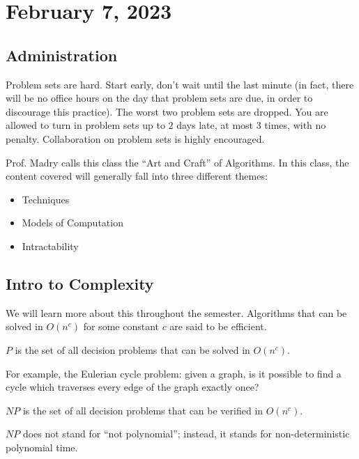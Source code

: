 \section{February 7, 2023}

\subsection{Administration}

Problem sets are hard. Start early, don't wait until the last minute (in fact, there will be no office hours on the day that problem sets are due, in order to discourage this practice). The worst two problem sets are dropped. You are allowed to turn in problem sets up to $2$ days late, at most $3$ times, with no penalty. Collaboration on problem sets is highly encouraged.

Prof. Madry calls this class the ``Art and Craft'' of Algorithms. In this class, the content covered will generally fall into three different themes: 
\begin{itemize}
    \setlength \itemsep{0.01cm}
    \item Techniques
    \item Models of Computation 
    \item Intractability
\end{itemize}

\subsection{Intro to Complexity}

We will learn more about this throughout the semester. Algorithms that can be solved in $O(n^c)$ for some constant $c$ are said to be efficient. 

\begin{definition}

$P$ is the set of all decision problems that can be solved in $O(n^c)$. 
\end{definition}

For example, the \ac{Eulerian cycle problem}: given a graph, is it possible to find a cycle which traverses every edge of the graph exactly once?

\begin{definition}

$NP$ is the set of all decision problems that can be verified in $O(n^c)$.
\end{definition}

$NP$ does not stand for ``not polynomial''; instead, it stands for non-deterministic polynomial time. 

